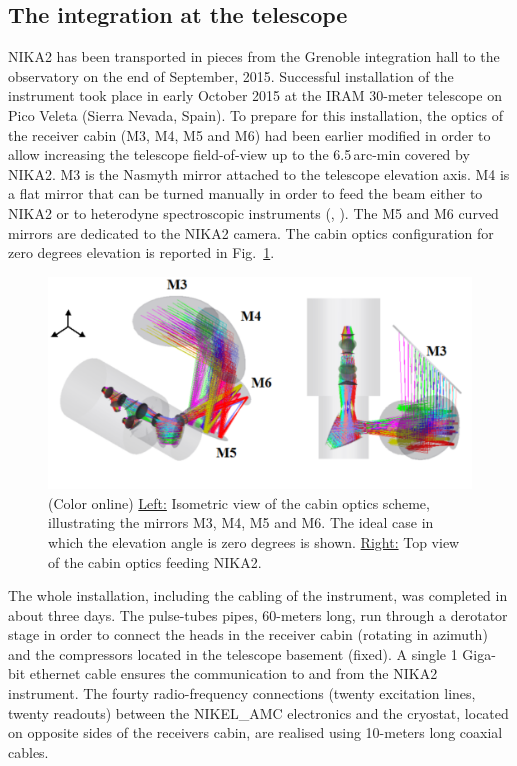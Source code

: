 \documentclass[]{aa} %
\begin{document}
\subsection{The integration at the telescope}
\label{The integration at the telescope}

NIKA2 has been transported in pieces from the Grenoble integration hall to the observatory on the end of September, 2015. Successful installation of the instrument took place in early October 2015 at the IRAM 30-meter telescope on Pico Veleta (Sierra Nevada, Spain). To prepare for this installation, the optics of the receiver cabin (M3, M4, M5 and M6) had been earlier modified in order to allow increasing the telescope field-of-view up to the 6.5\,arc-min covered by NIKA2. M3 is the Nasmyth mirror attached to the telescope elevation axis. M4 is a flat mirror that can be turned manually in order to feed the beam either to NIKA2 or to heterodyne spectroscopic instruments (\cite{Carter2012}, \cite{Schuster2004}). The M5 and M6 curved mirrors are dedicated to the NIKA2 camera. The cabin optics configuration for zero degrees elevation is reported in Fig.~\ref{figCabin}. 

\begin{figure}[h]
   \centering
    \includegraphics[width=.85\linewidth]{figCabin.png}
      \caption{(Color online) \underline{Left:} Isometric view of the cabin optics scheme, illustrating the mirrors M3, M4, M5 and M6. The ideal case in which the elevation angle is zero degrees is shown. \underline{Right:} Top view of the cabin optics feeding NIKA2.}
         \label{figCabin}
\end{figure}

The whole installation, including the cabling of the instrument, was completed in about three days. The pulse-tubes pipes, 60-meters long, run through a derotator stage in order to connect the heads in the receiver cabin (rotating in azimuth) and the compressors located in the telescope basement (fixed). A single 1 Giga-bit ethernet cable ensures the communication to and from the NIKA2 instrument. The fourty radio-frequency connections (twenty excitation lines, twenty readouts) between the NIKEL\_AMC electronics and the cryostat, located on opposite sides of the receivers cabin, are realised using 10-meters long coaxial cables. 
\end{document}
